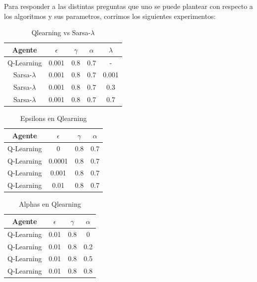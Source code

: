 \documentclass[11pt, a4paper]{article}
\newcommand{\slambda}{Sarsa-$\lambda$ }
\begin{document}
Para responder a las distintas preguntas que uno se puede plantear con respecto a los algoritmos y sus parametros, corrimos los siguientes experimentos:

\bigskip

\begin{table}[h]
\center
\begin{tabular}{ | c | c | c | c | c| }
  \hline
  Agente & $\epsilon$ & $\gamma$ & $\alpha$ & $\lambda$ \\
  \hline 
 	 Q-Learning  & 0.001  & 0.8  & 0.7 & - \\
	\slambda & 0.001  & 0.8  & 0.7 & 0.001 \\
	\slambda & 0.001  & 0.8  & 0.7 & 0.3 \\
	\slambda  & 0.001  & 0.8  & 0.7 & 0.7\\
  \hline
\end{tabular}
\caption {Qlearning vs \slambda}
\end{table}

\begin{table}[h]
\center
\begin{tabular}{ | c | c | c | c | }
  \hline
  Agente & $\epsilon$ & $\gamma$ & $\alpha$ \\
  \hline 
 	 Q-Learning  & 0  & 0.8  & 0.7 \\
	 Q-Learning  & 0.0001  & 0.8  & 0.7 \\
	 Q-Learning  & 0.001  & 0.8  & 0.7 \\
	 Q-Learning  & 0.01  & 0.8  & 0.7 \\
  \hline
\end{tabular}
\caption {Epsilons en Qlearning}
\end{table}

\begin{table}[h]
\center
\begin{tabular}{ | c | c | c | c | }
  \hline
  Agente & $\epsilon$ & $\gamma$ & $\alpha$ \\
  \hline 
 	 Q-Learning  & 0.01  & 0.8  & 0 \\
	 Q-Learning  & 0.01  & 0.8  & 0.2 \\
	 Q-Learning  & 0.01  & 0.8  & 0.5 \\
	 Q-Learning  & 0.01  & 0.8  & 0.8 \\
  \hline
\end{tabular}
\caption {Alphas en Qlearning}
\end{table}


\newpage
\end{document}
